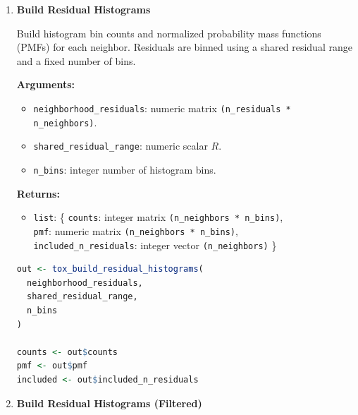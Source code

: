 \begin{enumerate}
        \textbf{Returns:}
        \begin{itemize}
            \item \lstinline!numeric!: shared residual range \(R\).
        \end{itemize}

        \begin{lstlisting}[language=R, caption={Shared Residual Range}]
R <- tox_determine_shared_residual_range(
  neighborhood_residuals_S1,
  neighborhood_residuals_S2,
  residual_range_quantile = 95.0
)
        \end{lstlisting}

    \item \textbf{Build Residual Histograms}

Build histogram bin counts and normalized probability mass functions (PMFs) for each neighbor.  
Residuals are binned using a shared residual range and a fixed number of bins.

\textbf{Arguments:}
\begin{itemize}
    \item \lstinline!neighborhood_residuals!: numeric matrix \lstinline!(n_residuals * n_neighbors)!.
    \item \lstinline!shared_residual_range!: numeric scalar \(R\).
    \item \lstinline!n_bins!: integer number of histogram bins.
\end{itemize}

\textbf{Returns:}
\begin{itemize}
    \item \lstinline!list!: \{
        \lstinline!counts!: integer matrix \lstinline!(n_neighbors * n_bins)!,\\
        \lstinline!pmf!: numeric matrix \lstinline!(n_neighbors * n_bins)!,\\
        \lstinline!included_n_residuals!: integer vector \lstinline!(n_neighbors)!
    \}
\end{itemize}

\begin{lstlisting}[language=R, caption={Residual Histogram Construction}]
out <- tox_build_residual_histograms(
  neighborhood_residuals,
  shared_residual_range,
  n_bins
)

counts <- out$counts
pmf <- out$pmf
included <- out$included_n_residuals
\end{lstlisting}

    \item \textbf{Build Residual Histograms (Filtered)}


\end{enumerate}
